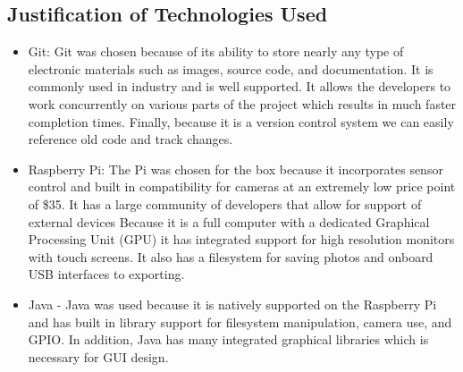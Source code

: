 \subsection{Justification of Technologies Used}
\begin{itemize}
	\item Git: Git was chosen because of its ability to store nearly any type of electronic materials such as images, source code, and documentation. It is commonly used in industry and is well supported. It allows the developers to work concurrently on various parts of the project which results in much faster completion times. Finally, because it is a version control system we can easily reference old code and track changes.

	\item Raspberry Pi: The Pi was chosen for the box because it incorporates sensor control and built in compatibility for cameras at an extremely low price point of \$35. It has a large community of developers that allow for support of external devices Because it is a full computer with a dedicated Graphical Processing Unit (GPU) it has integrated support for high resolution monitors with touch screens. It also has a filesystem for saving photos and onboard USB interfaces to exporting.

	\item Java - Java was used because it is natively supported on the Raspberry Pi and has built in library support for filesystem manipulation, camera use, and GPIO. In addition, Java has many integrated graphical libraries which is necessary for GUI design.
\end{itemize}
